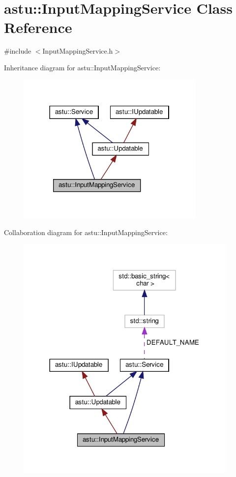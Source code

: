 \hypertarget{classastu_1_1InputMappingService}{}\section{astu\+:\+:Input\+Mapping\+Service Class Reference}
\label{classastu_1_1InputMappingService}


{\ttfamily \#include $<$Input\+Mapping\+Service.\+h$>$}



Inheritance diagram for astu\+:\+:Input\+Mapping\+Service\+:\nopagebreak
\begin{figure}[H]
\begin{center}
\leavevmode
\includegraphics[width=262pt]{classastu_1_1InputMappingService__inherit__graph}
\end{center}
\end{figure}


Collaboration diagram for astu\+:\+:Input\+Mapping\+Service\+:\nopagebreak
\begin{figure}[H]
\begin{center}
\leavevmode
\includegraphics[width=309pt]{classastu_1_1InputMappingService__coll__graph}
\end{center}
\end{figure}
